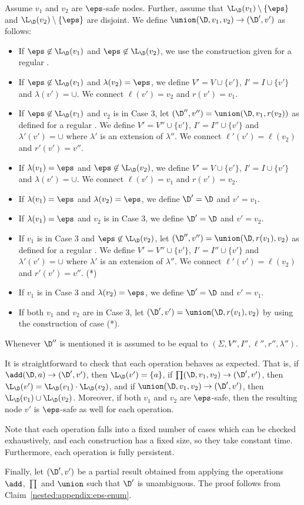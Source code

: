 Assume $v_1$ and $v_2$ are $\eps$-safe nodes. 
Further, assume that $\L_{\D}(v_1) \setminus \{\eps\}$ and $\L_{\D}(v_2)\setminus \{\eps\}$ are disjoint. 
We define $\union(\D,v_1, v_2) \to (\D',v')$ as follows:
\begin{itemize}
	\item If $\eps\not\in\L_{\D}(v_1)$ and $\eps\not\in\L_{\D}(v_2)$, we use the construction given for a regular \dsabbr.
	\item If $\eps\not\in\L_{\D}(v_1)$ and $\lambda(v_2) = \eps$, we define $V' = V \cup\{v'\}$, $I' = I\cup\{v'\}$ and $\lambda(v') = \cup$. We connect $\ell(v') = v_2$ and $r(v') = v_1$.
	\item If $\eps\not\in\L_{\D}(v_1)$ and $v_2$ is in Case 3, let $(\D'',v'') = \union(\D,v_1,r(v_2))$ as defined for a regular \dsabbr. We define $V' = V'' \cup\{v'\}$, $I' = I''\cup\{v'\}$ and $\lambda'(v') = \cup$ where $\lambda'$ is an extension of $\lambda''$. We connect $\ell'(v') = \ell(v_2)$ and $r'(v') = v''$.
	\item If $\lambda(v_1) = \eps$ and $\eps\not\in\L_{\D}(v_2)$, we define $V' = V \cup\{v'\}$, $I' = I\cup\{v'\}$ and $\lambda(v') = \cup$. We connect $\ell(v') = v_1$ and $r(v') = v_2$.
	\item If $\lambda(v_1) = \eps$ and $\lambda(v_2) = \eps$, we define $\D' = \D$ and $v' = v_1$.
	\item If $\lambda(v_1) = \eps$ and $v_2$ is in Case 3, we define $\D' = \D$ and $v' = v_2$.
	\item If $v_1$ is in Case 3 and $\eps\not\in\L_{\D}(v_2)$, let $(\D'',v'') = \union(\D,r(v_1),v_2)$ as defined for a regular \dsabbr.  We define $V' = V'' \cup\{v'\}$, $I' = I''\cup\{v'\}$ and $\lambda'(v') = \cup$ where $\lambda'$ is an extension of $\lambda''$. We connect $\ell'(v') = \ell(v_2)$ and $r'(v') = v''$. (*)
	\item If $v_1$ is in Case 3 and $\lambda(v_2) = \eps$, we define $\D' = \D$ and $v' = v_1$.
	\item If both $v_1$ and $v_2$ are in Case 3, let $(\D',v') = \union(\D,r(v_1),v_2)$ by using the construction of case (*).
\end{itemize}

Whenever $\D''$ is mentioned it is assumed to be equal to $(\Sigma, V'', I'', \ell'', r'', \lambda'')$.

It is straightforward to check that each operation behaves as expected. 
That is, if $\add(\D,a)\to(\D',v')$, then $\L_{\D}(v') = \{a\}$, if $\prod(\D,v_1,v_2)\to(\D',v')$, then $\L_{\D}(v') = \L_{\D}(v_1)\cdot\L_{\D}(v_2)$, and if $\union(\D,v_1,v_2)\to(\D',v')$, then $\L_{\D}(v_1)\cup\L_{\D}(v_2)$. 
Moreover, if both $v_1$ and $v_2$ are $\eps$-safe, then the resulting node $v'$ is $\eps$-safe as well for each operation.

Note that each operation falls into a fixed number of cases which can be checked exhaustively, and each construction has a fixed size, so they take constant time. 
Furthermore, each operation is fully persistent.

Finally, let $(\D',v')$ be a partial result obtained from applying the operations $\add$, $\prod$ and $\union$ such that $\D'$ is unambiguous. 
The proof follows from Claim~\ref{nested:appendix:eps-enum}.